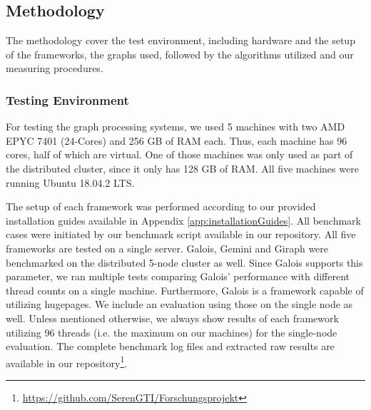 

\subsection{Methodology}
The methodology cover the test environment, including hardware and the setup of the frameworks, the graphs used, followed by the algorithms utilized and our measuring procedures.

\subsubsection{Testing Environment}
For testing the graph processing systems, we used 5 machines with two AMD EPYC 7401 (24-Cores) and 256 GB of RAM each. Thus, each machine has 96 cores, half of which are virtual. One of those machines was only used as part of the distributed cluster, since it only has 128 GB of RAM.
All five machines were running Ubuntu 18.04.2 LTS.

The setup of each framework was performed according to our provided installation guides available in Appendix \ref{app:installationGuides}.
All benchmark cases were initiated by our benchmark script available in our repository.
All five frameworks are tested on a single server.
Galois, Gemini and Giraph were benchmarked on the distributed 5-node cluster as well.
Since Galois supports this parameter, we ran multiple tests comparing Galois' performance with different thread counts on a single machine.
Furthermore, Galois is a framework capable of utilizing hugepages. We include an evaluation using those on the single node as well.
Unless mentioned otherwise, we always show results of each framework utilizing 96 threads (i.e. the maximum on our machines) for the single-node evaluation.
The complete benchmark log files and extracted raw results are available in our repository\footnote{\url{https://github.com/SerenGTI/Forschungsprojekt}}.


